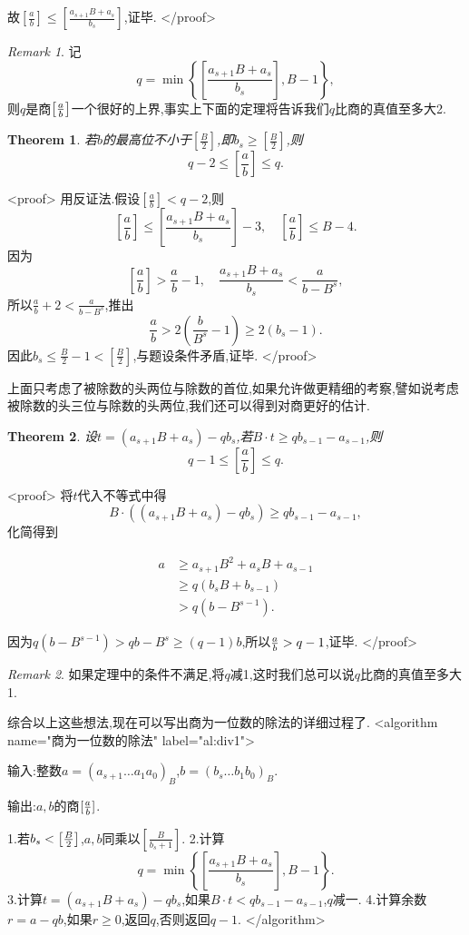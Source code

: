 \documentclass{ctexart}
\newtheorem{theorem}{Theorem}
\theoremstyle{remark}
\newtheorem{remark}{Remark}
\theoremstyle{definition}
\begin{document}
故$\left[\frac{a}{b}\right]\le\left[\frac{a_{s+1}B+a_s}{b_s}\right]$,证毕.
</proof>
\begin{remark}
记$$q = \min\left\{\left[\frac{a_{s+1}B+a_s}{b_s}\right],B-1\right\},$$则$q$是商$\left[{a\over b}\right]$一个很好的上界,事实上下面的定理将告诉我们$q$比商的真值至多大2.
\end{remark}

\begin{theorem}\label{th:division2}
若$b$的最高位不小于$\left[\frac{B}{2}\right]$,即$b_s\ge\left[\frac{B}{2}\right]$,则$$q-2\le\left[\frac{a}{b}\right]\le q.$$
\end{theorem}
<proof>
用反证法.假设$\left[\frac{a}{b}\right]<q-2$,则$$\left[\frac{a}{b}\right]\le\left[\frac{a_{s+1}B+a_s}{b_s}\right]-3,\quad\left[\frac{a}{b}\right] \le B-4.$$
因为$$\left[\frac{a}{b}\right]>\frac{a}{b}-1,\quad\frac{a_{s+1}B+a_s}{b_s}<\frac{a}{b-B^s},$$所以$\frac{a}{b}+2<\frac{a}{b-B^s}$,推出$$\frac{a}{b}>2(\frac{b}{B^s}-1)\ge 2(b_s-1).$$因此$b_s \le \frac{B}{2}-1<\left[\frac{B}{2}\right]$,与题设条件矛盾,证毕.
</proof>

上面只考虑了被除数的头两位与除数的首位,如果允许做更精细的考察,譬如说考虑被除数的头三位与除数的头两位,我们还可以得到对商更好的估计.
\begin{theorem}\label{th:division3}
设$t=(a_{s+1}B+a_s)-qb_s$,若$B\cdot t\ge qb_{s-1}-a_{s-1}$,则$$q-1\le\left[\frac{a}{b}\right]\le q.$$
\end{theorem}
<proof>
将$t$代入不等式中得$$B\cdot((a_{s+1}B+a_s)-qb_s)\ge qb_{s-1}-a_{s-1},$$化简得到

\begin{align*}
a&\ge a_{s+1}B^2+a_sB+a_{s-1}\\
&\ge q(b_sB+b_{s-1})\\
&>q(b-B^{s-1}).
\end{align*}

因为$q(b-B^{s-1})>qb-B^s\ge(q-1)b$,所以${a\over b}>q-1$,证毕.
</proof>
\begin{remark}
如果定理中的条件不满足,将$q$减1,这时我们总可以说$q$比商的真值至多大1.
\end{remark}

综合以上这些想法,现在可以写出商为一位数的除法的详细过程了.
<algorithm  name="商为一位数的除法" label="al:div1">

输入:整数$a=(a_{s+1}\ldots a_1a_0)_B$,$b=(b_s\ldots b_1b_0)_B$.

输出:$a,b$的商$[{a\over b}]$.

 1.若$b_s<\left[{B\over 2}\right]$,$a,b$同乘以$\left[\frac{B}{b_s+1}\right]$.
 2.计算$$q = \min\left\{\left[\frac{a_{s+1}B+a_s}{b_s}\right],B-1\right\}.$$
 3.计算$t=(a_{s+1}B+a_s)-qb_s$,如果$B\cdot t<qb_{s-1}-a_{s-1}$,$q$减一.
 4.计算余数$r=a-qb$,如果$r\ge 0$,返回$q$,否则返回$q-1$.
</algorithm>
\end{document}

